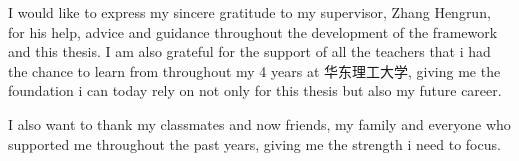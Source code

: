 I would like to express my sincere gratitude to my supervisor, Zhang Hengrun, for his help, advice and guidance throughout the development of the framework and this thesis. I am also grateful for the support of all the teachers that i had the chance to learn from throughout my 4 years at 华东理工大学, giving me the foundation i can today rely on not only for this thesis but also my future career.

I also want to thank my classmates and now friends, my family and everyone who supported me throughout the past years, giving me the strength i need to focus.